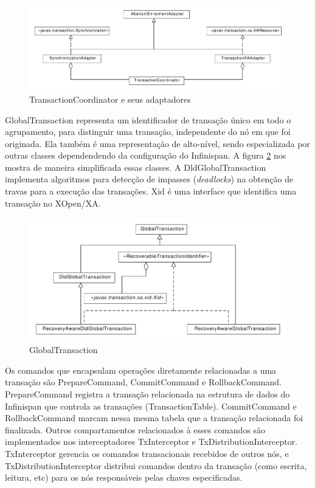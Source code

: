 \documentclass[11pt,twoside,a4paper]{book}
\begin{document}
\begin{figure}
  \centering
  \includegraphics[width=\textwidth]{transaction_coordinator} 
  \caption{TransactionCoordinator e seus adaptadores}
  \label{fig:transaction_coordinator} 
\end{figure}

GlobalTransaction representa um identificador de transação único em todo o agrupamento, para distinguir uma transação, independente do nó em que foi originada. Ela também é uma representação de alto-nível, sendo especializada por outras classes dependendendo da configuração do Infinispan. A figura \ref{fig:global_transaction} nos mostra de maneira simplificada essas classes. A DldGlobalTransaction implementa algoritmos para detecção de impasses (\emph{deadlocks}) na obtenção de travas para a execução das transações. Xid é uma interface que identifica uma transação no XOpen/XA.

\begin{figure}
  \centering
  \includegraphics[width=\textwidth]{global_transaction} 
  \caption{GlobalTransaction}
  \label{fig:global_transaction} 
\end{figure}

Os comandos que encapsulam operações diretamente relacionadas a uma transação são PrepareCommand, CommitCommand e RollbackCommand. PrepareCommand registra a transação relacionada na estrutura de dados do Infinispan que controla as transações (TransactionTable). CommitCommand e RollbackCommand marcam nessa mesma tabela que a transação relacionada foi finalizada. Outros compartamentos relacionados à esses comandos são implementados nos interceptadores TxInterceptor e TxDistributionInterceptor. TxInterceptor gerencia os comandos transacionais recebidos de outros nós, e TxDistributionInterceptor distribui comandos dentro da transação (como escrita, leitura, etc) para os nós responsáveis pelas chaves especificadas.
\end{document}
